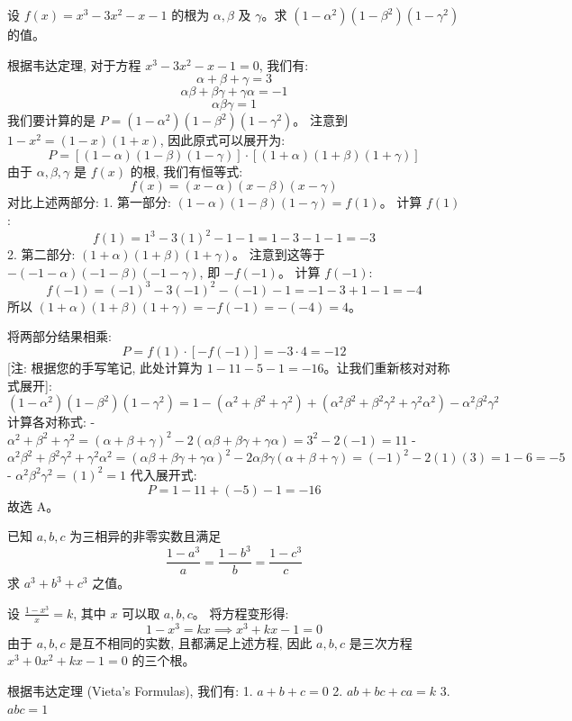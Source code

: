 \begin{questions}
    \question 设 $f(x) = x^3 - 3x^2 - x - 1$ 的根为 $\alpha, \beta$ 及 $\gamma$。求 $(1 - \alpha^2)(1 - \beta^2)(1 - \gamma^2)$ 的值。

\begin{solution}
根据韦达定理, 对于方程 $x^3 - 3x^2 - x - 1 = 0$, 我们有:
\[
\alpha + \beta + \gamma = 3
\]
\[
\alpha\beta + \beta\gamma + \gamma\alpha = -1
\]
\[
\alpha\beta\gamma = 1
\]
我们要计算的是 $P = (1 - \alpha^2)(1 - \beta^2)(1 - \gamma^2)$。
注意到 $1 - x^2 = (1 - x)(1 + x)$, 因此原式可以展开为:
\[
P = [(1 - \alpha)(1 - \beta)(1 - \gamma)] \cdot [(1 + \alpha)(1 + \beta)(1 + \gamma)]
\]
由于 $\alpha, \beta, \gamma$ 是 $f(x)$ 的根, 我们有恒等式:
\[
f(x) = (x - \alpha)(x - \beta)(x - \gamma)
\]
对比上述两部分:
1. 第一部分: $(1 - \alpha)(1 - \beta)(1 - \gamma) = f(1)$。
计算 $f(1)$:
\[
f(1) = 1^3 - 3(1)^2 - 1 - 1 = 1 - 3 - 1 - 1 = -3
\]
2. 第二部分: $(1 + \alpha)(1 + \beta)(1 + \gamma)$。
注意到这等于 $-(-1 - \alpha)(-1 - \beta)(-1 - \gamma)$, 即 $-f(-1)$。
计算 $f(-1)$:
\[
f(-1) = (-1)^3 - 3(-1)^2 - (-1) - 1 = -1 - 3 + 1 - 1 = -4
\]
所以 $(1 + \alpha)(1 + \beta)(1 + \gamma) = -f(-1) = -(-4) = 4$。

将两部分结果相乘:
\[
P = f(1) \cdot [-f(-1)] = -3 \cdot 4 = -12
\]
[注: 根据您的手写笔记, 此处计算为 $1 - 11 - 5 - 1 = -16$。让我们重新核对对称式展开]:
\[
(1 - \alpha^2)(1 - \beta^2)(1 - \gamma^2) = 1 - (\alpha^2 + \beta^2 + \gamma^2) + (\alpha^2\beta^2 + \beta^2\gamma^2 + \gamma^2\alpha^2) - \alpha^2\beta^2\gamma^2
\]
计算各对称式:
- $\alpha^2 + \beta^2 + \gamma^2 = (\alpha + \beta + \gamma)^2 - 2(\alpha\beta + \beta\gamma + \gamma\alpha) = 3^2 - 2(-1) = 11$
- $\alpha^2\beta^2 + \beta^2\gamma^2 + \gamma^2\alpha^2 = (\alpha\beta + \beta\gamma + \gamma\alpha)^2 - 2\alpha\beta\gamma(\alpha + \beta + \gamma) = (-1)^2 - 2(1)(3) = 1 - 6 = -5$
- $\alpha^2\beta^2\gamma^2 = (1)^2 = 1$
代入展开式:
\[
P = 1 - 11 + (-5) - 1 = -16
\]
故选 A。
\end{solution}

    \question 已知 $a, b, c$ 为三相异的非零实数且满足
\[
\frac{1 - a^3}{a} = \frac{1 - b^3}{b} = \frac{1 - c^3}{c}
\]
求 $a^3 + b^3 + c^3$ 之值。

\begin{solution}
设 $\frac{1 - x^3}{x} = k$, 其中 $x$ 可以取 $a, b, c$。
将方程变形得:
\[
1 - x^3 = kx \implies x^3 + kx - 1 = 0
\]
由于 $a, b, c$ 是互不相同的实数, 且都满足上述方程, 因此 $a, b, c$ 是三次方程 $x^3 + 0x^2 + kx - 1 = 0$ 的三个根。

根据韦达定理 (Vieta's Formulas), 我们有:
1. $a + b + c = 0$
2. $ab + bc + ca = k$
3. $abc = 1$


\end{solution}
\end{questions}
